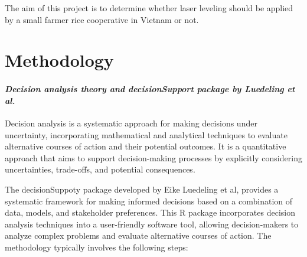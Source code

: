 \documentclass[
]{article}
\begin{document}
The aim of this project is to determine whether laser leveling should be
applied by a small farmer rice cooperative in Vietnam or not.

\hypertarget{methodology}{%
\section{Methodology}\label{methodology}}

\hypertarget{decision-analysis-theory-and-decisionsupport-package-by-luedeling-et-al.}{%
\paragraph{\texorpdfstring{\emph{Decision analysis theory and
decisionSupport package by Luedeling et
al.}}{Decision analysis theory and decisionSupport package by Luedeling et al.}}\label{decision-analysis-theory-and-decisionsupport-package-by-luedeling-et-al.}}

Decision analysis is a systematic approach for making decisions under
uncertainty, incorporating mathematical and analytical techniques to
evaluate alternative courses of action and their potential outcomes. It
is a quantitative approach that aims to support decision-making
processes by explicitly considering uncertainties, trade-offs, and
potential consequences.

The decisionSuppoty package developed by Eike Luedeling et al, provides
a systematic framework for making informed decisions based on a
combination of data, models, and stakeholder preferences. This R package
incorporates decision analysis techniques into a user-friendly software
tool, allowing decision-makers to analyze complex problems and evaluate
alternative courses of action. The methodology typically involves the
following steps:
\end{document}
